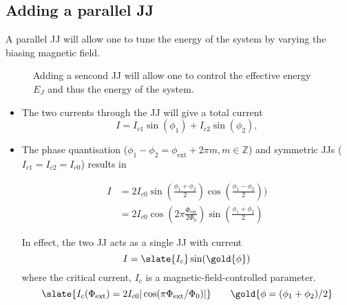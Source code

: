 \subsection{Adding a parallel JJ\label{subsec:cpb_2}}
\begin{framed}\noindent
  A parallel JJ will allow one to tune the energy of the system by varying the biasing magnetic field.
\end{framed}

\begin{figure}[h]
  \centering {}
  \caption{\small Adding a sencond JJ will allow one to control  the effective energy $E_{J}$ and thus the energy of the
    system.\label{fig:cooper_pair_box_3_tuneable}}
\end{figure}

\begin{itemize}
\item    The   two    currents   through    the   JJ    will    give   a    total   current    \begin{equation}   I    =
    I_{c1}\sin(\phi_1)+I_{c2}\sin(\phi_2),
  \end{equation}

\item  The phase  quantisation ($  \phi_1-\phi_2 =  \phi_\text{ext} +  2\pi m,  m \in  \mathbb{Z} $)  and symmetric  JJs
  ($I_{c1}=I_{c2}=I_{c0}$) results in

  \begin{equation}
    \begin{aligned}
      I & = 2I_{c0}\sin(\frac{\phi_1+\phi_2}{2})\cos(\frac{\phi_1-\phi_2}{2})) \\
      & = 2I_{c0}\cos(2\pi\frac{\Phi_{\text{ext}}}{2\Phi_0})\sin(\frac{\phi_1+\phi_2}{2})
    \end{aligned}
  \end{equation}

\begin{framed}\noindent
  In effect, the two JJ acts as a single JJ with current
  \begin{equation}
    I = \slate{I_{c}}\sin(\gold{\phi})
  \end{equation}
  \noindent where the critical current, $I_c$ is a magnetic-field-controlled parameter.
  \begin{equation}
    \slate{I_{c}(\Phi_\text{ext}) = 2I_{c0}|\cos(\pi\Phi_\text{ext}/\Phi_0)|} \qquad \gold{\phi = (\phi_1+\phi_2)/2}
  \end{equation}


\end{framed}
\end{itemize}
